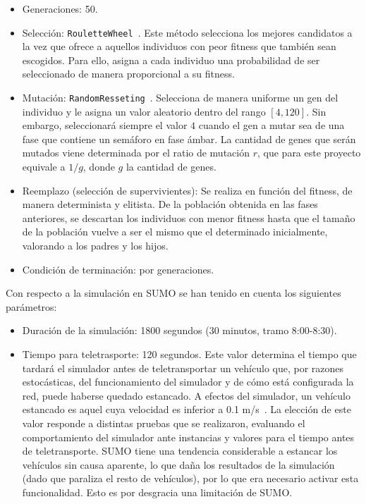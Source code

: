 \begin{itemize}
    \item Generaciones: 50. 
    \item Selección: \texttt{RouletteWheel}~\cite{lipowski_roulette-wheel_2012}. Este método selecciona los mejores candidatos a la vez que ofrece a aquellos individuos con peor fitness que también sean escogidos. Para ello, asigna a cada individuo una probabilidad de ser seleccionado de manera proporcional a su fitness.
    \item Mutación: \texttt{RandomResseting}~\cite{abrante_dorta_framework_2019}. Selecciona de manera uniforme un gen del individuo y le asigna un valor aleatorio dentro del rango $[4,120]$. Sin embargo, seleccionará siempre el valor $4$ cuando el gen a mutar sea de una fase que contiene un semáforo en fase ámbar. La cantidad de genes que serán mutados viene determinada por el ratio de mutación $r$, que para este proyecto equivale a $1 / g$, donde $g$ la cantidad de genes.
    \item Reemplazo (selección de supervivientes): Se realiza en función del fitness, de manera determinista y elitista. De la población obtenida en las fases anteriores, se descartan los individuos con menor fitness hasta que el tamaño de la población vuelve a ser el mismo que el determinado inicialmente, valorando a los padres y los hijos.
    \item Condición de terminación: por generaciones.
\end{itemize}


Con respecto a la simulación en SUMO se han tenido en cuenta los siguientes parámetros:

\begin{itemize}
    \item Duración de la simulación: 1800 segundos (30 minutos, tramo 8:00-8:30).
    \item Tiempo para teletrasporte: 120 segundos. Este valor determina el tiempo que tardará el simulador antes de teletransportar un vehículo que, por razones estocásticas, del funcionamiento del simulador y de cómo está configurada la red, puede haberse quedado estancado. A efectos del simulador, un vehículo estancado es aquel cuya velocidad es inferior a 0.1 m/s~\cite{noauthor_simulationwhy_nodate}. La elección de este valor responde a distintas pruebas que se realizaron, evaluando el comportamiento del simulador ante instancias y valores para el tiempo antes de teletransporte. SUMO tiene una tendencia considerable a estancar los vehículos sin causa aparente, lo que daña los resultados de la simulación (dado que paraliza el resto de vehículos), por lo que era necesario activar esta funcionalidad. Esto es por desgracia una limitación de SUMO.
\end{itemize}

